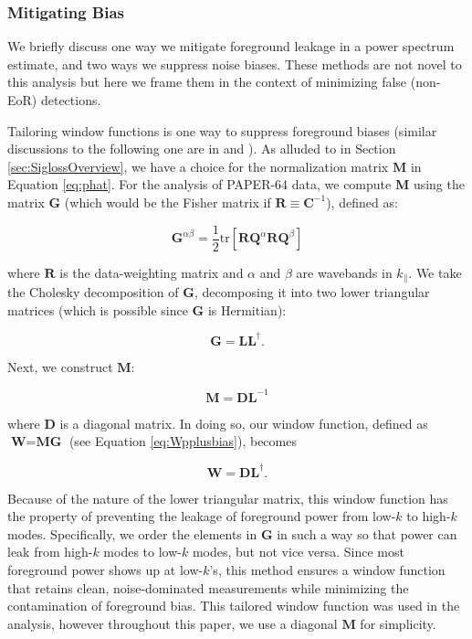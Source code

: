 \documentclass[preprint2,numberedappendix,tighten]{aastex6}  %
\begin{document}
\subsubsection{Mitigating Bias}
\label{sec:MitBias}

We briefly discuss one way we mitigate foreground leakage in a power spectrum estimate, and two ways we 
suppress noise biases. These methods are not novel to this analysis but here we frame them in the context of minimizing false 
(non-EoR) detections. 

Tailoring window functions is one way to suppress foreground biases (similar discussions to the following one are in \citet{liu_et_al2014b} and ). As alluded to in Section \ref{sec:SiglossOverview}, we 
have a choice for the normalization matrix $\textbf{M}$ in Equation \eqref{eq:phat}. For the analysis of PAPER-64 data, we 
compute $\textbf{M}$ using the matrix $\textbf{G}$ (which would be the Fisher matrix if $\textbf{R} \equiv \textbf{C}^{-1}$), defined as:

\begin{equation}
\textbf{G}^{\alpha\beta} = \frac{1}{2} \text{tr} [\textbf{R}\textbf{Q}^{\alpha}\textbf{R}\textbf{Q}^{\beta} ]
\end{equation}

\noindent where $\textbf{R}$ is the data-weighting matrix and $\alpha$ and $\beta$ are wavebands in $k_{\parallel}$. We take 
the Cholesky decomposition of $\textbf{G}$, decomposing it into two lower triangular matrices (which is possible since $\textbf{G}$ is Hermitian):

\begin{equation}
\textbf{G} = \textbf{LL}^{\dagger}.
\end{equation}

\noindent Next, we construct $\textbf{M}$:

\begin{equation}
\textbf{M} = \textbf{DL}^{-1}
\end{equation}

\noindent where $\textbf{D}$ is a diagonal matrix. In doing so, our window function, defined as $\textbf{W} = \textbf{MG}$ (see Equation \eqref{eq:Wpplusbias}), 
becomes

\begin{equation}
\textbf{W} = \textbf{DL}^{\dagger}.
\end{equation}

\noindent Because of the nature of the lower triangular matrix, this window function has the property of preventing the leakage 
of foreground power from low-$k$ to high-$k$ modes. Specifically, we order the elements in $\textbf{G}$ in such a way so that 
power can leak from high-$k$ modes to low-$k$ modes, but not vice versa. Since most foreground power shows up at low-$k$'s, this method ensures a window function that retains clean, noise-dominated measurements while minimizing the 
contamination of foreground bias. This tailored window function was used in the  analysis, however throughout this paper, we use a diagonal $\textbf{M}$ for simplicity.
\end{document}
